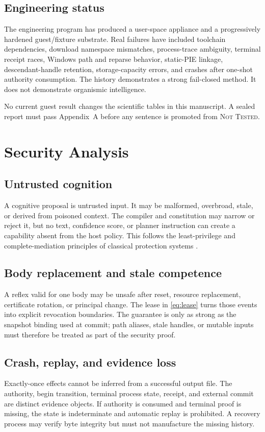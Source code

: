 \documentclass[journal,10pt]{IEEEtran}
\newcommand{\NotTested}{\textsc{Not Tested}}
\begin{document}
\subsection{Engineering status}
The engineering program has produced a user-space appliance and a progressively hardened guest/fixture substrate. Real failures have included toolchain dependencies, download namespace mismatches, process-trace ambiguity, terminal receipt races, Windows path and reparse behavior, static-PIE linkage, descendant-handle retention, storage-capacity errors, and crashes after one-shot authority consumption. The history demonstrates a strong fail-closed method. It does not demonstrate organismic intelligence.

No current guest result changes the scientific tables in this manuscript. A sealed report must pass Appendix~A before any sentence is promoted from \NotTested{}.

\section{Security Analysis}
\subsection{Untrusted cognition}
A cognitive proposal is untrusted input. It may be malformed, overbroad, stale, or derived from poisoned context. The compiler and constitution may narrow or reject it, but no text, confidence score, or planner instruction can create a capability absent from the host policy. This follows the least-privilege and complete-mediation principles of classical protection systems \cite{saltzer1975protection}.

\subsection{Body replacement and stale competence}
A reflex valid for one body may be unsafe after reset, resource replacement, certificate rotation, or principal change. The lease in \eqref{eq:lease} turns those events into explicit revocation boundaries. The guarantee is only as strong as the snapshot binding used at commit; path aliases, stale handles, or mutable inputs must therefore be treated as part of the security proof.

\subsection{Crash, replay, and evidence loss}
Exactly-once effects cannot be inferred from a successful output file. The authority, begin transition, terminal process state, receipt, and external commit are distinct evidence objects. If authority is consumed and terminal proof is missing, the state is indeterminate and automatic replay is prohibited. A recovery process may verify byte integrity but must not manufacture the missing history.
\end{document}
